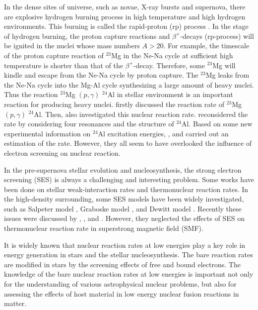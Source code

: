 \documentclass[manuscript]{aastex}
\begin{document}
In the dense sites of universe, such as novae, X-ray bursts and
supernova, there are explosive hydrogen burning process in high
temperature  and high hydrogen environments. This burning is called
the rapid-proton (rp) process \citep{Wallace81}. In the stage of
hydrogen burning, the proton capture reactions and
$\beta^{+}$-decays (rp-process) will be ignited in the nuclei whose
mass numbers $A>20$. For example, the timescale of the proton
capture reaction of $^{23}$Mg in the Ne-Na cycle at sufficient high
temperature is shorter than that of the $\beta^{+}$-decay.
Therefore, some $^{23}$Mg will kindle and escape from the Ne-Na
cycle by proton capture. The $^{23}$Mg leaks from the Ne-Na cycle
into the Mg-Al cycle synthesizing a large amount of heavy nuclei.
Thus the reaction $^{23}$Mg $(p,\gamma)$ $^{24}$Al in stellar
environment is an important reaction for producing heavy nuclei.
\citet{Wallace81} firstly discussed the reaction rate of $^{23}$Mg
$(p, \gamma)$ $^{24}$Al. Then, \citet{Iliadis01} also investigated
this nuclear reaction rate. \citet{Kubono95} reconsidered the rate
by considering four resonances and the structure of $^{24}$Al. Based
on some new experimental information on $^{24}$Al excitation
energies, \citet{Herndl98, Visser07}, and \citet{Lotay08} carried
out an estimation of the rate. However, they all seem to have
overlooked the influence of electron screening on nuclear reaction.


In the pre-supernova stellar evolution and nucleosynthesis, the
strong electron screening (SES) is always a challenging and
interesting problem. Some works \citep{Bahcall02, Liu13, Liu14,
Liu16, Liu17a, Liu17b} have been done on stellar weak-interaction
rates and thermonuclear reaction rates. In the high-density
surrounding, some SES models have been widely investigated, such as
Salpeter model \citep{Salpeter54, Salpeter69}, Graboske model
\citep{Graboske73}, and Dewitt model \citep{Dewitt76}. Recently
these issues were discussed by \citet{Liolios00, Liolios01},
\citet{Kravchuk14}, and \citet{Liu13}. However, they neglected the
effects of SES on thermonuclear reaction rate in superstrong
magnetic field (SMF).


It is widely known that nuclear reaction rates at low energies play
a key role in energy generation in stars and the stellar
nucleosynthesis. The bare reaction rates are modified in stars by
the screening effects of free and bound electrons. The knowledge of
the bare nuclear reaction rates at low energies is important not
only for the understanding of various astrophysical nuclear
problems, but also for assessing the effects of host material in low
energy nuclear fusion reactions in matter.
\end{document}
